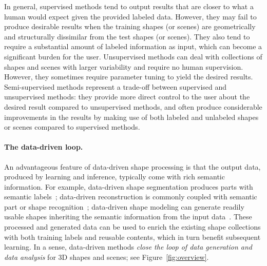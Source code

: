 In general, supervised methods tend to output results that are closer to what a human would expect given the provided labeled data. However, they may fail to produce desirable results when the training shapes (or scenes) are geometrically and structurally dissimilar from the test shapes (or scenes). They also tend to require a substantial amount of labeled information as input, which can become a significant burden for the user. Unsupervised methods can deal with collections of shapes and scenes with larger variability and require no human supervision. However, they sometimes require parameter tuning to yield the desired results. Semi-supervised methods represent a trade-off between supervised and unsupervised methods: they provide more direct control to the user about the desired result compared to unsupervised methods, and often produce considerable improvements in the results by making use of both labeled and unlabeled shapes or scenes compared to supervised methods.


\paragraph*{The data-driven loop.}
An advantageous feature of data-driven shape processing is that the output data, produced by learning and inference, typically come with rich semantic information.
For example, data-driven shape segmentation produces parts with semantic labels~\cite{Kalogerakis:2010:LMS}; data-driven reconstruction is commonly coupled with semantic part or shape recognition~\cite{Shen:2012:SRP,Nan:2012:SAC}; data-driven shape modeling can generate readily usable shapes inheriting the semantic information from the input data~\cite{Xu:2011:PMO}.
These processed and generated data can be used to enrich the existing shape collections with both training labels and reusable contents, which in turn benefit subsequent learning. In a sense,
data-driven methods \emph{close the loop of data generation and data analysis} for 3D shapes and scenes; see Figure~\ref{fig:overview}.

